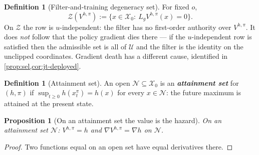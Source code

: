 \documentclass[11pt]{article}
\theoremstyle{plain}
\newtheorem{proposition}[theorem]{Proposition}
\theoremstyle{definition}
\newtheorem{definition}[theorem]{Definition}
\theoremstyle{remark}
\newcommand{\calX}{\mathcal{X}}
\newcommand{\calU}{\mathcal{U}}
\newcommand{\Vhp}[1]{V^{h,#1}}
\newcommand{\Vhpi}{\Vhp{\pi}}
\newcommand{\Lg}{L_g}
\newcommand{\grad}{\nabla}
\newcommand{\eqdef}{:=}
\begin{document}
\begin{definition}[Filter-and-training degeneracy set]\label{def:degen}
For fixed $o$,
\begin{equation}
\mathcal Z(\Vhpi)\eqdef\{x\in\calX_0:\ \Lg\Vhpi(x)=0\}.
\end{equation}
On $\mathcal Z$ the row is $u$-independent: the filter has no first-order authority over
$\Vhpi$. It does \emph{not} follow that the policy gradient dies there --- if the
$u$-independent row is satisfied then the admissible set is all of $\calU$ and the filter is
the identity on the unclipped coordinates. Gradient death has a different cause, identified in
\cref{prop:sel,cor:jt-deployed}.
\end{definition}

\begin{definition}[Attainment set]\label{def:attain}
An open $\mathcal N\subseteq\calX_0$ is an \textbf{\emph{attainment set}} for $(h,\pi)$ if
$\sup_{t\ge0}h(x_t^\pi)=h(x)$ for every $x\in\mathcal N$: the future maximum is attained at the
present state.
\end{definition}

\begin{proposition}[On an attainment set the value is the hazard]\label{prop:attain}
On an attainment set $\mathcal N$: $\Vhpi=h$ and $\grad\Vhpi=\grad h$ on $\mathcal N$.
\end{proposition}
\begin{proof}
Two functions equal on an open set have equal derivatives there.
\end{proof}
\end{document}
